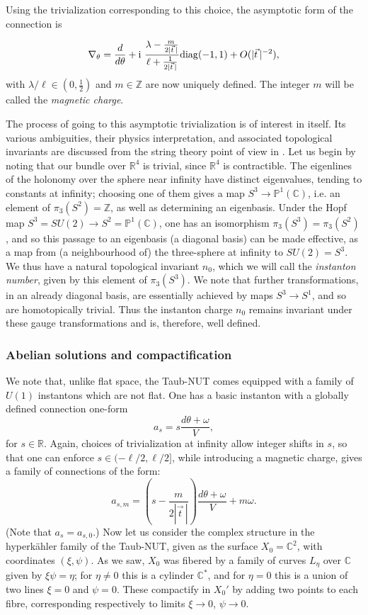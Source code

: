 \documentclass[12pt]{article}
\theoremstyle{definition}
\theoremstyle{remark}
\numberwithin{theorem}{section}
\renewcommand{\i}{\mathrm{i}}
\def\bZ{{\mathbb {Z}}}
\def\bR{{\mathbb {R}}}
\def\bC{{\mathbb {C}}}
\def\bP{{\mathbb {P}}}
\begin{document}
 Using the trivialization corresponding to this choice, the asymptotic form of the connection \cite[Thm. 22]{Cherkis:2016gmo} is 

$$\nabla_\theta = \frac{d}{d\theta} + \i \ \frac{\lambda -\frac{m }{2|\vec{t}\,|}}{\ell+\frac{1}{2|\vec{t}\,|}} {\rm diag}(-1,1)  + O(|\vec{t}\,|^{-2}),$$
with $\lambda/\ell\in(0,\frac12)$ and $m\in \bZ$ are now uniquely defined. The integer $m$ will be called the {\it magnetic charge}.

The process of going to this asymptotic  trivialization is of interest in itself.  Its various ambiguities, their physics interpretation, and associated topological invariants are discussed from the string theory point of view in \cite{Witten09}. Let us begin by noting that our bundle over $\bR^4$ is trivial, since $\mathbb{R}^4$ is contractible. The eigenlines of the holonomy over the sphere near infinity have distinct  eigenvalues, tending to constants at infinity; choosing one of them gives a map $S^3\rightarrow \bP^1(\bC)$,
 i.e. an element of $\pi_3(S^2) = \bZ$, as well as determining an eigenbasis. Under the Hopf map $S^3 = SU(2)\rightarrow S^2= \bP^1(\bC)$, one has an isomorphism $\pi_3(S^3) = \pi_3(S^2)$, and so this passage to an eigenbasis (a diagonal basis) can be made effective, as a map from  (a neighbourhood of) the three-sphere  at infinity to $SU(2) = S^3$. We thus have a natural topological invariant $n_0$, which we will call the {\it instanton number}, given by this element of $\pi_3(S^3)$. We note that further transformations, in an already diagonal basis, are essentially achieved by maps $S^3\rightarrow S^1$, and so are homotopically trivial. Thus the instanton charge $n_0$ remains invariant under these gauge transformations and is, therefore, well defined.
  
\subsubsection{Abelian solutions and compactification} 
We note that, unlike flat space, the Taub-NUT comes equipped with a family of $U(1)$ instantons which are not flat. One has a basic instanton with a globally defined connection one-form
$$a_s =  s \frac{d\theta +\omega}{V},$$
for $s\in \bR$. Again, choices of trivialization  at infinity allow integer shifts in $s$, so that one can  enforce $s\in (-\ell/2,\ell/2]$, while introducing   a magnetic charge, gives a family of connections of the form:
 $$ a_{s,m} = (s - \frac{m}{2 |\vec{t}\,|}) \frac{d\theta +\omega}{V} +m \omega.$$
(Note that $a_s = a_{s,0}$.) Now let us consider the   complex structure in the hyperk\"ahler family of the Taub-NUT, given as the surface $X_0= \bC^2$, with coordinates $(\xi,\psi)$. As we saw, $X_0$ was fibered by a family of curves $L_\eta$ over $\bC$ given by $\xi\psi = \eta$; for $\eta\neq 0$ this is a cylinder $\bC^*$, and for $\eta= 0$ this is a union of two lines $\xi=0$ and $\psi = 0$. These compactify in $X_0'$ by adding two points to each fibre, corresponding respectively to   limits $\xi\rightarrow 0$, $\psi\rightarrow 0$.
\end{document}

